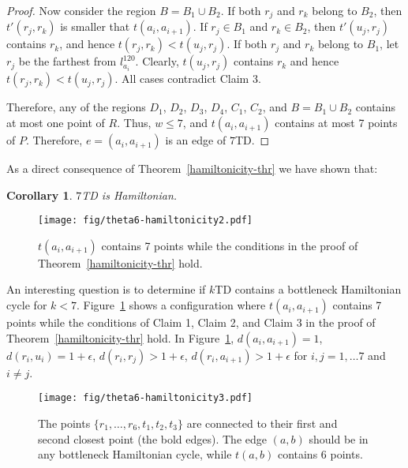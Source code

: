 \documentclass[11pt,a4paper]{article}
\newcommand{\kTD}[2]{$#1$\text{-}TD#2}
\newtheorem{corollary}{Corollary}
\begin{document}
\begin{proof}
Now consider the region $B=B_1\cup B_2$. If both $r_j$ and $r_k$ belong to $B_2$, then $t'(r_j, r_k)$ is smaller that $t(a_i, a_{i+1})$. If $r_j\in B_1$ and $r_k\in B_2$, then $t'(u_j,r_j)$ contains $r_k$, and hence $t(r_j, r_k)<t(u_j, r_j)$. If both $r_j$ and $r_k$ belong to $B_1$, let $r_j$ be the farthest from $l_{a_i}^{120}$. Clearly, $t(u_j, r_j)$ contains $r_k$ and hence $t(r_j, r_k)<t(u_j, r_j)$. All cases contradict Claim 3.

Therefore, any of the regions $D_1$, $D_2$, $D_3$, $D_4$, $C_1$, $C_2$, and $B=B_1\cup B_2$ contains at most one point of $R$. Thus, $w \le 7$, and $t(a_i, a_{i+1})$ contains at most 7 points of $P$. Therefore, $e=(a_i, a_{i+1})$ is an edge of \kTD{7}{}.
\end{proof}

As a direct consequence of Theorem~\ref{hamiltonicity-thr} we have shown that:
\begin{corollary}
 \kTD{7}{} is Hamiltonian.
\end{corollary}

\begin{figure}[htb]
  \centering
  \texttt{[image: fig/theta6-hamiltonicity2.pdf]}
 \caption{$t(a_i,a_{i+1})$ contains 7 points while the conditions in the proof of Theorem~\ref{hamiltonicity-thr} hold.}
  \label{hamiltonicity-fig2}
\end{figure}

An interesting question is to determine if \kTD{k}{} contains a bottleneck Hamiltonian cycle for $k<7$.
Figure~\ref{hamiltonicity-fig2} shows a configuration where $t(a_i, a_{i+1})$ contains 7 points while the conditions of Claim 1, Claim 2, and Claim 3 in the proof of Theorem~\ref{hamiltonicity-thr} hold. In Figure~\ref{hamiltonicity-fig2}, $d(a_i, a_{i+1})=1$, $d(r_i, u_i)= 1+\epsilon$, $d(r_i, r_j)>1+\epsilon$, $d(r_i, a_{i+1})> 1+\epsilon$ for $i,j=1,\dots 7$ and $i\neq j$.  



\begin{figure}[htb]
  \centering
  \texttt{[image: fig/theta6-hamiltonicity3.pdf]}
 \caption{The points $\{r_1,\dots,r_6,t_1,t_2,t_3\}$ are connected to their first and second closest point (the bold edges). The edge $(a,b)$ should be in any bottleneck Hamiltonian cycle, while $t(a,b)$ contains 6 points.}
  \label{hamiltonicity-fig3}
\end{figure}
\end{document}
